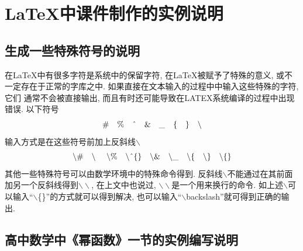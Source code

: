 
\section{\LaTeX{}中课件制作的实例说明}

\subsection{生成一些特殊符号的说明}

在\LaTeX{}中有很多字符是系统中的保留字符, 在\LaTeX{}被赋予了特殊的意义, 或不一定存在于正常的字库之中. 如果直接在文本输入的过程中中输入这些特殊的字符, 它们 通常不会被直接输出, 而且有时还可能导致在LATEX系统编译的过程中出现错误. 以下符号
$$\#\quad  \% \quad \text{\^{}} \quad \& \quad\_ \quad \{ \quad\} \quad \backslash$$
输入方式是在这些符号前加上反斜线$\backslash$
    $$\backslash\# \quad \backslash\ \quad \backslash\% \quad \backslash\text{\^{}}\{\} \quad \backslash\&\quad\backslash\_ \quad \backslash\{\quad\backslash\}\quad \backslash\{\}$$
其他一些特殊符号可以由数学环境中的特殊命令得到. 反斜线$\backslash$不能通过在其前面加另一个反斜线得到$\backslash\backslash$, 在上文中也说过, $\backslash\backslash$是一个用来换行的命令. 如上述$\backslash$可以输入“$\backslash$\{\}”的方式就可以得到解决, 也可以输入“$\backslash$backslash”就可得到正确的输出.

\subsection{高中数学中《幂函数》一节的实例编写说明}

